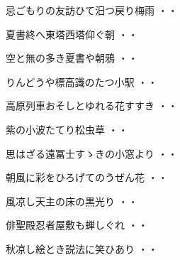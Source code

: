 \begin{shiika}忌ごもりの友訪ひて汨つ戻り梅雨
\hfill{・・}\end{shiika}
\vspace{0.6cm}
\begin{shiika}夏書終へ東塔西塔仰ぐ朝
\hfill{・・}\end{shiika}
\vspace{0.6cm}
\begin{shiika}空と無の多き夏書や朝鴉
\hfill{・・}\end{shiika}
\vspace{0.6cm}
\begin{shiika}りんどうや標高識のたつ小駅
\hfill{・・}\end{shiika}
\vspace{0.6cm}
\begin{shiika}高原列車おそしとゆれる花すすき
\hfill{・・}\end{shiika}
\vspace{0.6cm}
\begin{shiika}紫の小波たてり松虫草
\hfill{・・}\end{shiika}
\vspace{0.6cm}
\begin{shiika}思はざる遠冨士すゝきの小窓より
\hfill{・・}\end{shiika}
\vspace{0.6cm}
\begin{shiika}朝風に彩をひろげてのうぜん花
\hfill{・・}\end{shiika}
\vspace{0.6cm}
\begin{shiika}風凉し天主の床の黒光り
\hfill{・・}\end{shiika}
\vspace{0.6cm}
\begin{shiika}俳聖殿忍者屋敷も蝉しぐれ
\hfill{・・}\end{shiika}
\vspace{0.6cm}
\begin{shiika}秋凉し絵とき説法に笑ひあり
\hfill{・・}\end{shiika}
\vspace{0.6cm}
